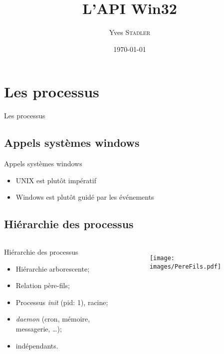\title{L'API Win32}
\subtitle{}

\author{Yves \textsc{Stadler}}

\date{\today}




\begin{frame}
\titlepage
\end{frame}

\def\sectitle{Les processus}
\section{\sectitle}

\begin{frame}{\sectitle}
    \def\subsectitle{Appels systèmes windows}
    \subsection{\subsectitle}

    \begin{block}{\subsectitle}
        \begin{itemize}
            \item UNIX est plutôt impératif
            \item Windows est plutôt guidé par les événements
        \end{itemize}
    \end{block}

    \def\subsectitle{Hiérarchie des processus}
    \subsection{\subsectitle}

    \begin{columns}[b]
        \begin{block}{\subsectitle}
            \begin{itemize}
                \item Hiérarchie arborescente;
                \item Relation père-fils;
                \item Processus \textit{init} (pid: 1), racine;
                \item \textit{daemon} (cron, mémoire, messagerie, \dots);
                \item indépendants.
            \end{itemize}
        \end{block}

        \begin{figure}
            \texttt{[image: images/PereFils.pdf]}
        \end{figure}
    \end{columns}
\end{frame}


